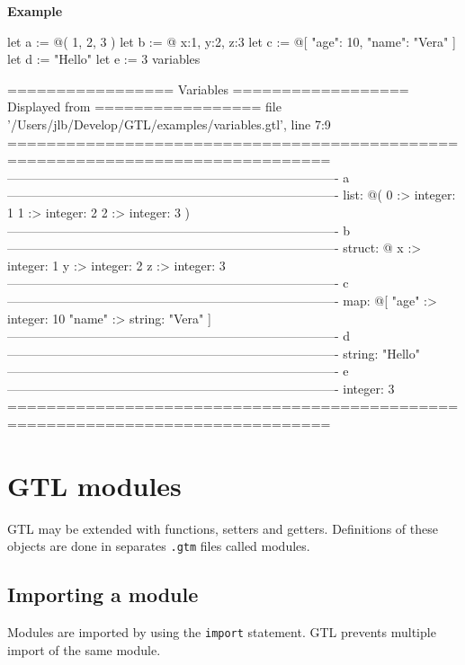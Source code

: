 \documentclass[10pt,openright,twosides]{report}
\newcommand{\gtlinline}[1]{\colorbox{light-blue}{\lstinline[language=gtl]{#1}}}
\newcommand{\example}{\vspace{.75em}\noindent\textbf{Example}\vspace{0em}}
\begin{document}
\example
\begin{gtl}
let a := @( 1, 2, 3 )
let b := @{ x:1, y:2, z:3 }
let c := @[ "age": 10, "name": "Vera" ]
let d := "Hello"
let e := 3
variables
\end{gtl}
\begin{console}
================= Variables ================== Displayed from =================
file '/Users/jlb/Develop/GTL/examples/variables.gtl', line 7:9
===============================================================================
-------------------------------------------------------------------------------
a
-------------------------------------------------------------------------------
list: @(
    0 :>
        integer: 1
    1 :>
        integer: 2
    2 :>
        integer: 3
)
-------------------------------------------------------------------------------
b
-------------------------------------------------------------------------------
struct: @{
    x :>
        integer: 1
    y :>
        integer: 2
    z :>
        integer: 3
}
-------------------------------------------------------------------------------
c
-------------------------------------------------------------------------------
map: @[
    "age" :>
        integer: 10
    "name" :>
        string: "Vera"
]
-------------------------------------------------------------------------------
d
-------------------------------------------------------------------------------
string: "Hello"
-------------------------------------------------------------------------------
e
-------------------------------------------------------------------------------
integer: 3
===============================================================================
\end{console}

\chapter{GTL modules}
\label{chap:modules}

GTL may be extended with functions, setters and getters. Definitions of these objects are done in  separates \texttt{\footnotesize .gtm} files called modules.

\section{Importing a module}

Modules are imported by using the \gtlinline{import} statement. GTL prevents multiple import of the same module.
\end{document}
